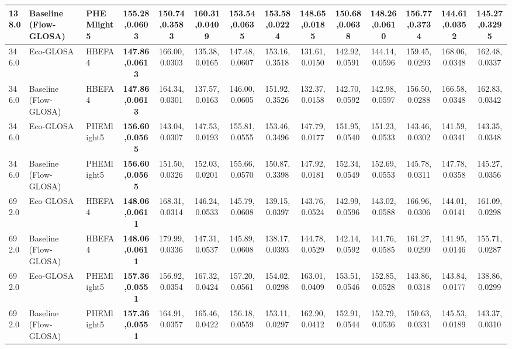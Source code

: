 \begin{table}[htb]
{\begin{tabular}{l l l *{11}{c}}
      138.0 & Baseline (Flow-GLOSA)    & PHEMlight5   & \textbf{155.28,0.0603}   & 150.74,0.3583 & 160.31,0.0409 & 153.54,0.0635 & 153.58,0.0224 & 148.65,0.0185 & 150.68,0.0638 & 148.26,0.0610 & 156.77,0.3734 & 144.61,0.0352 & 145.27,0.3295 \\
      \midrule
      346.0 & Eco-GLOSA                & HBEFA4       & \textbf{147.86,0.0613}   & 166.00,0.0303 & 135.38,0.0165 & 147.48,0.0607 & 153.16,0.3518 & 131.61,0.0150 & 142.92,0.0591 & 144.14,0.0596 & 159.45,0.0293 & 168.06,0.0348 & 162.48,0.0337 \\
      346.0 & Baseline (Flow-GLOSA)    & HBEFA4       & \textbf{147.86,0.0613}   & 164.34,0.0301 & 137.57,0.0163 & 146.00,0.0605 & 151.92,0.3526 & 132.37,0.0158 & 142.70,0.0592 & 142.98,0.0597 & 156.50,0.0288 & 166.58,0.0348 & 162.83,0.0342 \\
      346.0 & Eco-GLOSA                & PHEMlight5   & \textbf{156.60,0.0565}   & 143.04,0.0307 & 147.53,0.0193 & 155.81,0.0555 & 153.46,0.3496 & 147.79,0.0177 & 151.95,0.0540 & 151.23,0.0533 & 143.46,0.0302 & 141.59,0.0341 & 143.35,0.0348 \\
      346.0 & Baseline (Flow-GLOSA)    & PHEMlight5   & \textbf{156.60,0.0565}   & 151.50,0.0326 & 152.03,0.0201 & 155.66,0.0570 & 150.87,0.3398 & 147.92,0.0181 & 152.34,0.0549 & 152.69,0.0553 & 145.78,0.0311 & 147.78,0.0358 & 145.27,0.0356 \\
      \midrule
      692.0 & Eco-GLOSA                & HBEFA4       & \textbf{148.06,0.0611}   & 168.31,0.0314 & 146.24,0.0533 & 145.79,0.0608 & 139.15,0.0397 & 143.76,0.0524 & 142.99,0.0596 & 143.02,0.0588 & 166.96,0.0306 & 144.01,0.0141 & 161.09,0.0298 \\
      692.0 & Baseline (Flow-GLOSA)    & HBEFA4       & \textbf{148.06,0.0611}   & 179.99,0.0336 & 147.31,0.0537 & 145.89,0.0608 & 138.17,0.0393 & 144.78,0.0529 & 142.14,0.0592 & 141.76,0.0585 & 161.27,0.0299 & 141.95,0.0146 & 155.71,0.0287 \\
      692.0 & Eco-GLOSA                & PHEMlight5   & \textbf{157.36,0.0551}   & 156.92,0.0354 & 167.32,0.0424 & 157.20,0.0561 & 154.02,0.0298 & 163.01,0.0409 & 153.51,0.0546 & 152.85,0.0528 & 143.86,0.0318 & 143.84,0.0177 & 138.86,0.0299 \\
      692.0 & Baseline (Flow-GLOSA)    & PHEMlight5   & \textbf{157.36,0.0551}   & 164.91,0.0357 & 165.46,0.0422 & 156.18,0.0559 & 153.11,0.0297 & 162.90,0.0412 & 152.91,0.0544 & 152.79,0.0536 & 150.63,0.0331 & 145.53,0.0189 & 143.37,0.0310 \\
      \midrule

\end{tabular}}
\end{table}
